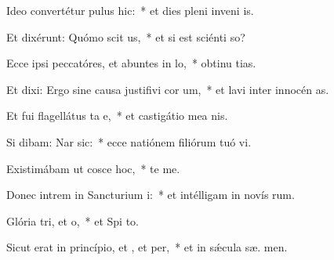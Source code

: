\item Ideo convertétur pulus  hic:~* et dies pleni inveni  is.
\item Et dixérunt: Quómo scit us,~* et si est sciénti  so?
\item Ecce ipsi peccatóres, et abuntes in lo,~* obtinu tias.
\item Et dixi: Ergo sine causa justifivi cor um,~* et lavi inter innocén  as.
\item Et fui flagellátus ta e,~* et castigátio mea  nis.
\item Si dibam: Nar sic:~* ecce natiónem filiórum tuó vi.
\item Existimábam ut cosce hoc,~*   te me.
\item Donec intrem in Sancturium i:~* et intélligam in novís rum.
\item Glória tri, et o,~* et Spi to.
\item Sicut erat in princípio, et , et per,~* et in sǽcula sæ. men.
